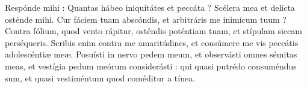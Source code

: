 
Respónde mihi :
Quantas hábeo iniquitátes et peccáta ? Scélera mea et delícta osténde mihi.
Cur fáciem tuam abscóndis, et arbitráris me inimícum tuum ?
Contra fólium, quod vento rápitur, osténdis poténtiam tuam, et stípulam siccam perséqueris.
Scribis enim contra me amaritúdines, et consúmere me vis peccátis adolescéntiæ meæ.
Posuísti in nervo pedem meum, et observásti omnes sémitas meas, et vestígia pedum meórum considerásti :
qui quasi putrédo consuméndus sum, et quasi vestiméntum quod coméditur a tínea.
